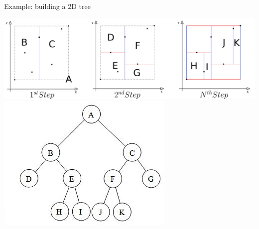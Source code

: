 \documentclass{beamer}
\begin{document}
\begin{frame}{Example: building a 2D tree}
\begin{center}
\includegraphics[scale=0.3]{images/scheme_volume_kdtree.png}\\
\vspace{0.5cm}
\includegraphics[scale=0.5]{images/binary_tree2.jpg}
\end{center}
\end{frame}
\end{document}
